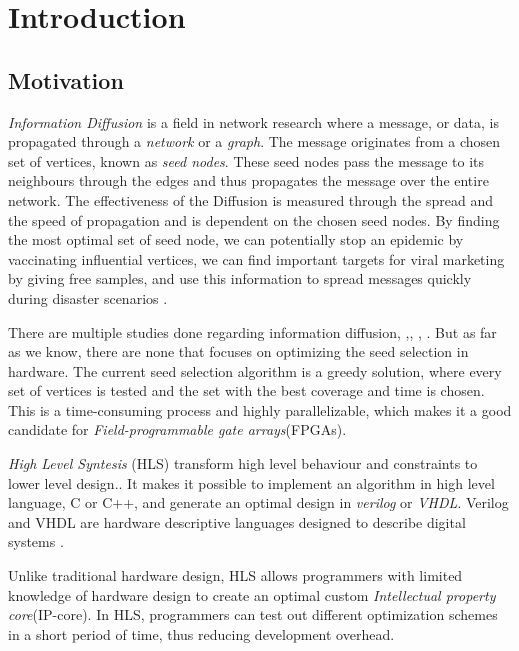 \chapter{Introduction} \label{intro}

\section{Motivation}
\textit{Information Diffusion} is a field in network research where a message, or data, is propagated through a \textit{network} or a \textit{graph}. The message originates from a chosen set of vertices, known as \textit{seed nodes}. These seed nodes pass the message to its neighbours through the edges and thus propagates the message over the entire network. The effectiveness of the Diffusion is measured through the spread and the speed of propagation and is dependent on the chosen seed nodes. By finding the most optimal set of seed node, we can potentially stop an epidemic by vaccinating influential vertices, we can find important targets for viral marketing by giving free samples, and use this information to spread messages quickly during disaster scenarios\cite{InformationDiffusionThroughBlogspace} \cite{Romero:2011:DMI:1963405.1963503}.

There are multiple studies done regarding information diffusion, \cite{InformationDiffusionThroughBlogspace},\cite{cha2010measuring},  \cite{5694014},  \cite{InfoDiffAndExternalInfluInNetworks}. But as far as we know, there are none that focuses on optimizing the seed selection in hardware. The current seed selection algorithm is a greedy solution\cite{greedyInfluenc2005}, where every set of vertices is tested and the set with the best coverage and time is chosen. This is a time-consuming process and highly parallelizable, which makes it a good candidate for \textit{Field-programmable gate arrays}(FPGAs). 

\textit{High Level Syntesis} (HLS) transform high level behaviour and constraints to lower level design.\cite{52214}. It makes it possible to implement an algorithm in high level language, C or C++, and generate an optimal design in \textit{verilog} or \textit{VHDL}. Verilog and VHDL are hardware descriptive languages designed to describe digital systems \cite{thomas2008verilog}. 

Unlike traditional hardware design, HLS allows programmers with limited knowledge of hardware design to create an optimal custom \textit{Intellectual property core}(IP-core). In HLS, programmers can test out different optimization schemes in a short period of time, thus reducing development overhead.  


